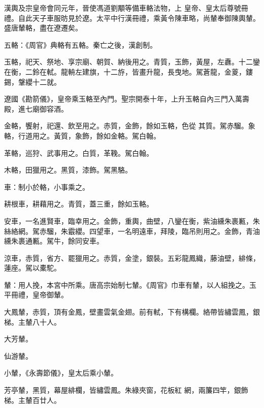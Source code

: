 \begin{pinyinscope}
 漢輿及宗皇帝會同元年，晉使馮道劉顒等備車輅法物，上
 皇帝、皇太后尊號冊禮。自此天子車服昉見於遼。太平中行漢冊禮，乘黃令陳車略，尚輦奉御陳輿輦。盛唐輦輅，盡在遼遷矣。



 五輅：《周官》典輅有五輅。秦亡之後，漢創制。



 玉輅，祀天、祭地、享宗廟、朝賀、納後用之。青質，玉飾，黃屋，左纛。十二鑾在衡，二鈴在軾。龍輈左建旗，十二斿，皆畫升龍，長曳地。駕蒼龍，金葼，鏤錫，鞶纓十二就。



 遼國《勘箭儀》，皇帝乘玉輅至內門。聖宗開泰十年，上升玉輅自內三門入萬壽殿，進七廟御容酒。



 金輅，饗射，祀還、飲至用之。赤質，金飾，餘如玉輅，色從
 其質。駕赤騮。象輅，行道用之。黃質，象飾，餘如金輅。駕白翰。



 革輅，巡狩、武事用之。白質，革鞔。駕白翰。



 木輅，田獵用之。黑質，漆飾。駕黑駱。



 車：制小於輅，小事乘之。



 耕根車，耕藉用之。青質，蓋三重，餘如玉輅。



 安車，一名進賢車，臨幸用之。金飾，重輿，曲壁，八鑾在衡，紫油纁朱裹甉，朱絲絡網。駕赤騮，朱霵纓。四望車，一名明遠車，拜陵，臨吊則用之。金飾，青油纁朱裹通甉。駕牛，餘同安車。



 涼車，赤質，省方、罷獵用之。赤質，金塗，銀裝。五彩龍鳳織，藤油壁，緋條，蓮座。駕以橐駝。



 輦：用人挽，本宮中所乘。唐高宗始制七輦。《周官》巾車有輦，以人組挽之。玉平冊禮，皇帝御輦。



 大鳳輦，赤質，頂有金鳳，壁畫雲氣金翅。前有軾，下有構欄。絡帶皆繡雲鳳，銀梯。主輦八十人。



 大芳輦。



 仙游輦。



 小輦，《永壽節儀》，皇太后乘小輦。



 芳亭輦，黑質，幕屋緋欄，皆繡雲鳳。朱綠夾窗，花板紅
 網，兩簾四竿，銀飾梯。主輦百廿人。




\end{pinyinscope}
